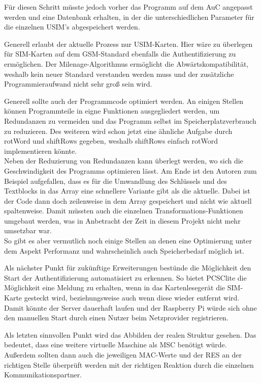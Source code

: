 		Für diesen Schritt müsste jedoch vorher das Programm auf dem AuC angepasst
		werden und eine Datenbank erhalten, in der die unterschiedlichen Parameter für
		die einzelnen USIM's abgespeichert werden.

		Generell erlaubt der aktuelle Prozess nur USIM-Karten. Hier wäre zu überlegen
		für SIM-Karten auf dem GSM-Standard ebenfalls die
		Authentifizierung zu ermöglichen. Der Milenage-Algorithmus ermöglicht die
		Abwärtskompatibilität, weshalb kein neuer Standard verstanden werden muss und
		der zusätzliche Programmieraufwand nicht sehr groß sein wird.
	
		Generell sollte auch der Programmcode optimiert werden. An einigen Stellen
		können Programmteile in eigne Funktionen ausgegliedert werden, um Redundanzen
		zu vermeiden und das Programm selbst im Speicherplatzverbrauch zu reduzieren. Des
		weiteren wird schon jetzt eine ähnliche Aufgabe durch rotWord und shiftRows
		gegeben, weshalb shiftRows einfach rotWord implementieren könnte. \\
		Neben der Reduzierung von Redundanzen kann überlegt werden, wo sich die
		Geschwindigkeit des Programms optimieren lässt. Am Ende ist den Autoren zum
		Beispiel aufgefallen, dass es für die Umwandlung des Schlüssels und des
		Textblocks in das Array eine schnellere Variante gibt als die aktuelle. Dabei
		ist der Code dann doch zeilenweise in dem Array gespeichert und nicht wie aktuell
		spaltenweise. Damit müssten auch die einzelnen Transformations-Funktionen
		umgebaut werden, was in Anbetracht der Zeit in diesem Projekt nicht mehr umsetzbar
		war. \\
		So gibt es aber vermutlich noch einige Stellen an denen eine Optimierung unter dem
		Aspekt Performanz und wahrscheinlich auch Speicherbedarf möglich ist.
	
		Als nächster Punkt für zukünftige Erweiterungen bestünde die Möglichkeit den
		Start der Authentifizierung automatisiert zu erkennen. So bietet PCSClite die
		Möglichkeit eine Meldung zu erhalten, wenn in das Kartenlesegerät die SIM-Karte
		gesteckt wird, beziehungsweise auch wenn diese wieder entfernt wird. Damit
		könnte der Server dauerhaft laufen und der Raspberry Pi würde sich ohne den
		manuellen Start durch einen Nutzer beim Netzprovider registrieren.

		Als letzten sinnvollen Punkt wird das Abbilden der realen Struktur gesehen. Das
		bedeutet, dass eine weitere virtuelle Maschine als MSC benötigt würde. Außerdem
		sollten dann auch die jeweiligen MAC-Werte und der RES an der richtigen Stelle
		überprüft werden mit der richtigen Reaktion durch die einzelnen Kommunikationspartner.